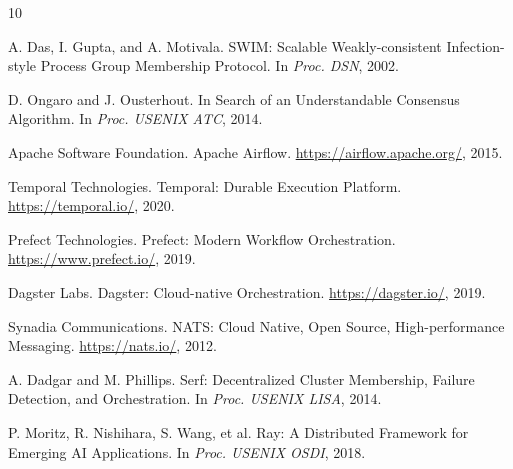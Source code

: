 \documentclass[sigconf]{acmart}
\begin{document}
\begin{thebibliography}{10}

A. Das, I. Gupta, and A. Motivala.
\newblock SWIM: Scalable Weakly-consistent Infection-style Process Group Membership Protocol.
\newblock In \emph{Proc. DSN}, 2002.

D. Ongaro and J. Ousterhout.
\newblock In Search of an Understandable Consensus Algorithm.
\newblock In \emph{Proc. USENIX ATC}, 2014.

Apache Software Foundation.
\newblock Apache Airflow.
\newblock \url{https://airflow.apache.org/}, 2015.

Temporal Technologies.
\newblock Temporal: Durable Execution Platform.
\newblock \url{https://temporal.io/}, 2020.

Prefect Technologies.
\newblock Prefect: Modern Workflow Orchestration.
\newblock \url{https://www.prefect.io/}, 2019.

Dagster Labs.
\newblock Dagster: Cloud-native Orchestration.
\newblock \url{https://dagster.io/}, 2019.

Synadia Communications.
\newblock NATS: Cloud Native, Open Source, High-performance Messaging.
\newblock \url{https://nats.io/}, 2012.

A. Dadgar and M. Phillips.
\newblock Serf: Decentralized Cluster Membership, Failure Detection, and Orchestration.
\newblock In \emph{Proc. USENIX LISA}, 2014.

P. Moritz, R. Nishihara, S. Wang, et al.
\newblock Ray: A Distributed Framework for Emerging AI Applications.
\newblock In \emph{Proc. USENIX OSDI}, 2018.

\end{thebibliography}
\end{document}
